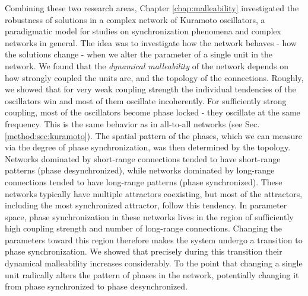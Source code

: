 Combining these two research areas, Chapter \ref{chap:malleability} investigated the robustness of solutions in a complex network of Kuramoto oscillators, a paradigmatic model for studies on synchronization phenomena and complex networks in general. The idea was to investigate how the network behaves - how the solutions change - when we alter the parameter of a single unit in the network. We found that the \textit{dynamical malleability} of the network depends on how strongly coupled the units are, and the topology of the connections. 
Roughly, we showed that for very weak coupling strength the individual tendencies of the oscillators win and most of them oscillate incoherently. For sufficiently strong coupling, most of the oscillators become phase locked - they oscillate at the same frequency. This is the same behavior as in all-to-all networks (see Sec.\ref{method:sec:kuramoto}). The spatial pattern of the phases, which we can measure via the degree of phase synchronization, was then determined by the topology. Networks dominated by short-range connections tended to have short-range patterns (phase desynchronized), while networks dominated by long-range connections tended to have long-range patterns (phase synchronized). These networks typically have multiple attractors coexisting, but most of the attractors, including the most synchronized attractor, follow this tendency.
In parameter space, phase synchronization in these networks lives in the region of sufficiently high coupling strength and number of long-range connections. Changing the parameters toward this region therefore makes the system undergo a transition to phase synchronization. We showed that precisely during this transition their dynamical malleability increases considerably. To the point that changing a single unit radically alters the pattern of phases in the network, potentially changing it from phase synchronized to phase desynchronized. 

